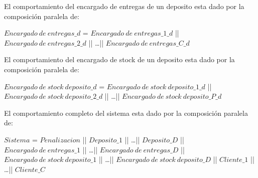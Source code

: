 El comportamiento del encargado de entregas de un deposito esta dado por la composición paralela de:
\begin{center}
$Encargado\ de\ entregas\_d$ = $Encargado\ de\ entregas\_1\_d$ || $Encargado\ de\ entregas\_2\_d$ || \ldots || $Encargado\ de\ entregas\_C\_d$
\end{center}

El comportamiento del encargado de stock de un deposito esta dado por la composición paralela de:
\begin{center}
$Encargado\ de\ stock\ deposito\_d$ = $Encargado\ de\ stock\ deposito\_1\_d$ || $Encargado\ de\ stock\ deposito\_2\_d$ || \ldots || $Encargado\ de\ stock\ deposito\_P\_d$
\end{center}

El comportamiento completo del sistema esta dado por la composición paralela de:
\begin{center}
$Sistema$ = $Penalizacion$ || $Deposito\_1$ || \ldots || $Deposito\_D$ || $Encargado\ de\ entregas\_1$ || \ldots || $Encargado\ de\ entregas\_D$ || $Encargado\ de\ stock\ deposito\_1$ || \ldots || $Encargado\ de\ stock\ deposito\_D$ || $Cliente\_1$ || \ldots || $Cliente\_C$
\end{center}

